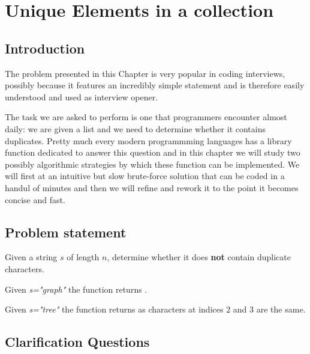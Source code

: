 %


\chapter{Unique Elements in a collection}
\label{ch:unique_elements}
\section*{Introduction}
The problem presented in this Chapter is very popular in coding interviews, 
possibly because it features an incredibly simple statement and is therefore easily understood and used as interview opener. 

The task we are asked to perform is one that programmers encounter almost daily: we are given a list and we need to determine whether it contains duplicates.
Pretty much every modern programmming languages has a library function dedicated to answer this question and in this chapter we will study two possibly algorithmic strategies by which these function can be implemented.
We will  first at an intuitive but slow brute-force solution that can be coded in a handul of minutes and then we will refine and rework it to the point it becomes concise and fast.

\section{Problem statement}
\begin{exercise}
Given a string $s$ of length $n$, determine whether it does \textbf{not} contain duplicate characters. 

\begin{example}
Given \textit{s="graph"} the function returns .
\end{example}

\begin{example}
	Given \textit{s="tree"} the function returns  as characters at indices $2$ and $3$ are the same.
	\end{example}
\end{exercise}

\section{Clarification Questions}

